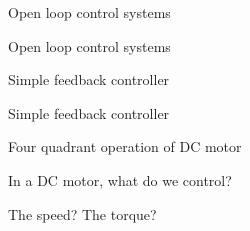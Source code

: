 \documentclass[compress]{beamer}
\begin{document}
{
    \begin{frame}{Open loop control systems}
    \end{frame}
}

{
    \begin{frame}{Open loop control systems}
    \end{frame}
}

{
    \begin{frame}{Simple feedback controller}
    \end{frame}
}

{
    \begin{frame}{Simple feedback controller}
    \end{frame}
}


\begin{frame}{Four quadrant operation of DC motor}

    In a DC motor, what do we control? 
    
    The speed? The torque?

\end{frame}
\end{document}
